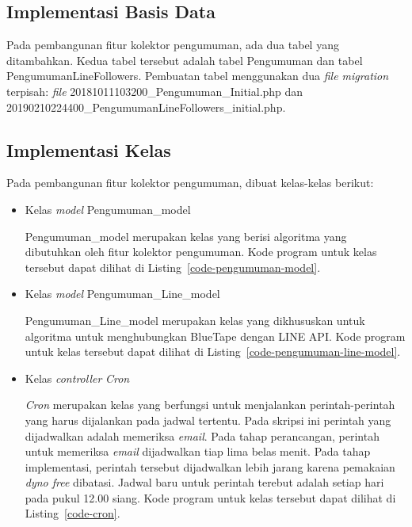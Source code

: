 \subsection{Implementasi Basis Data}
Pada pembangunan fitur kolektor pengumuman, ada dua tabel yang ditambahkan. Kedua tabel tersebut adalah tabel Pengumuman dan tabel PengumumanLineFollowers. Pembuatan tabel menggunakan dua \textit{file migration} terpisah: \textit{file} 20181011103200\_Pengumuman\_Initial.php dan 20190210224400\_PengumumanLineFollowers\_initial.php.

\subsection{Implementasi Kelas}
Pada pembangunan fitur kolektor pengumuman, dibuat kelas-kelas berikut: 
\begin{itemize}
\item Kelas \textit{model} Pengumuman\_model

Pengumuman\_model merupakan kelas yang berisi algoritma yang dibutuhkan oleh fitur kolektor pengumuman. Kode program untuk kelas tersebut dapat dilihat di Listing~\ref{code-pengumuman-model}.



\item Kelas \textit{model} Pengumuman\_Line\_model

Pengumuman\_Line\_model merupakan kelas yang dikhususkan untuk algoritma untuk menghubungkan BlueTape dengan LINE API. Kode program untuk kelas tersebut dapat dilihat di Listing~\ref{code-pengumuman-line-model}.



\item Kelas \textit{controller} \textit{Cron}

\textit{Cron} merupakan kelas yang berfungsi untuk menjalankan perintah-perintah yang harus dijalankan pada jadwal tertentu. Pada skripsi ini perintah yang dijadwalkan adalah memeriksa \textit{email}. Pada tahap perancangan, perintah untuk memeriksa \textit{email} dijadwalkan tiap lima belas menit. Pada tahap implementasi, perintah tersebut dijadwalkan lebih jarang karena pemakaian \textit{dyno free} dibatasi. Jadwal baru untuk perintah terebut adalah setiap hari pada pukul 12.00 siang. Kode program untuk kelas tersebut dapat dilihat di Listing~\ref{code-cron}.


\end{itemize}
